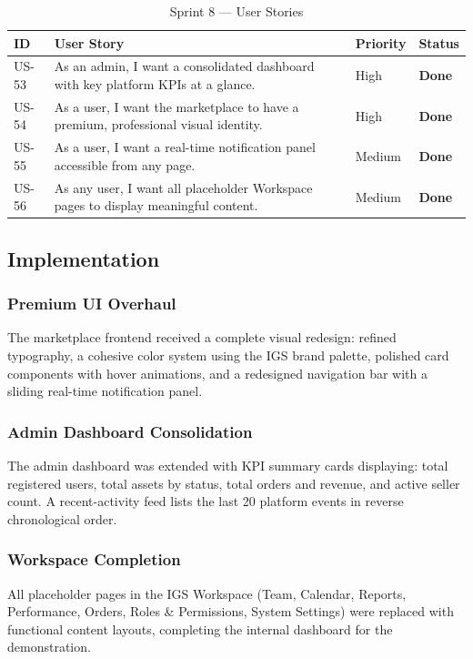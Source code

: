 \begin{table}[H]
\centering
\caption{Sprint 8 --- User Stories}
\begin{tabularx}{\textwidth}{C{1cm} X C{2cm} C{2.5cm}}
\toprule
\textbf{ID} & \textbf{User Story} & \textbf{Priority} & \textbf{Status} \\
\midrule
US-53 & As an admin, I want a consolidated dashboard with key platform KPIs at a glance. & High & \textcolor{igsGreen}{\textbf{Done}} \\
US-54 & As a user, I want the marketplace to have a premium, professional visual identity. & High & \textcolor{igsGreen}{\textbf{Done}} \\
US-55 & As a user, I want a real-time notification panel accessible from any page. & Medium & \textcolor{igsGreen}{\textbf{Done}} \\
US-56 & As any user, I want all placeholder Workspace pages to display meaningful content. & Medium & \textcolor{igsGreen}{\textbf{Done}} \\
\bottomrule
\end{tabularx}
\end{table}

\subsection{Implementation}

\subsubsection{Premium UI Overhaul}
The marketplace frontend received a complete visual redesign: refined typography, a cohesive color system using the IGS brand palette, polished card components with hover animations, and a redesigned navigation bar with a sliding real-time notification panel.

\subsubsection{Admin Dashboard Consolidation}
The admin dashboard was extended with KPI summary cards displaying: total registered users, total assets by status, total orders and revenue, and active seller count. A recent-activity feed lists the last 20 platform events in reverse chronological order.

\subsubsection{Workspace Completion}
All placeholder pages in the IGS Workspace (Team, Calendar, Reports, Performance, Orders, Roles \& Permissions, System Settings) were replaced with functional content layouts, completing the internal dashboard for the demonstration.


